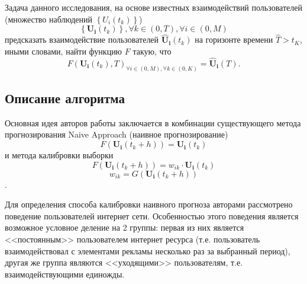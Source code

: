 \documentclass[a4paper, 14pt]{extreport}
\begin{document}
    Задача данного исследования, на основе известных взаимодействий пользователей
    (множество наблюдений $\left\{ U_i \left(t_k\right) \right\}$)
    \begin{equation}
        \left\{ \mathbf{U_i}\left(t_k\right)\right\},
        \forall k \in \left(0, T\right),
        \forall i \in \left( 0, M \right)
    \end{equation}
    предсказать взаимодействие пользователей $\mathbf{\widehat{U}_i}\left(t_k\right)$ на горизонте времени
    $\widehat{T} > t_K$, иными словами, найти функцию $F$ такую, что
    \begin{equation}
        F\left( \mathbf{U_i}\left(t_k \right), T \right)_{
        \forall i \in (0, M),
        \forall k \in \left(0, K\right)}
        = \mathbf{\widehat{U}_i}\left(T\right).
    \end{equation}

    \subsection*{Описание алгоритма}

    Основная идея авторов работы заключается в комбинации существующего метода прогнозирования Naive Approach (наивное
    прогнозирование)
    \begin{equation}
        F\left( \mathbf{U_i}\left(t_k + h \right) \right)
        = \mathbf{U_i}\left(t_k\right)
    \end{equation}
    и метода калибровки выборки
    \begin{equation}
        F\left( \mathbf{U_i}\left(t_k + h \right) \right)
        = w_{ik} \cdot \mathbf{{U}_i}\left(t_k\right)
    \end{equation}
    \begin{equation}
        w_{ik} = G\left( \mathbf{U_i}\left(t_k + h \right) \right)
    \end{equation}.

    Для определения способа калибровки наивного прогноза авторами рассмотрено поведение пользователей интернет сети.
    Особенностью этого поведения является возможное условное деление на 2 группы: первая из них является <<постоянным>>
    пользователем интернет ресурса (т.е. пользователь взаимодействовал с элементами рекламы несколько раз за выбранный
    период), другая же группа являются <<уходящими>> пользователям, т.е. взаимодействующими единожды.
\end{document}
